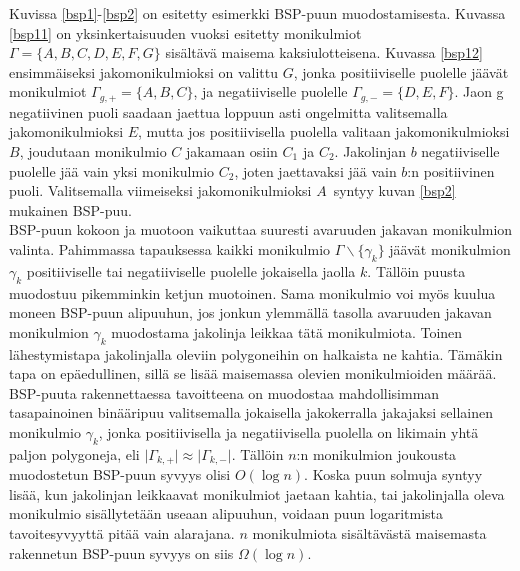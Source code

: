 \documentclass[a4paper, 12pt, titlepage]{article}
\newcommand{\abs}[1]{\vert #1 \vert} %
\begin{document}
Kuvissa \ref{bsp1}-\ref{bsp2} on esitetty esimerkki BSP-puun muodostamisesta. Kuvassa \ref{bsp11} on yksinkertaisuuden vuoksi esitetty monikulmiot $\Gamma=\{A,B,C,D,E,F,G\}$ sisältävä maisema kaksiulotteisena. Kuvassa \ref{bsp12} ensimmäiseksi jakomonikulmioksi on valittu $G$, jonka positiiviselle puolelle jäävät monikulmiot $\Gamma_{g,+} = \{A,B,C\}$, ja negatiiviselle puolelle $\Gamma_{g,-} = \{D,E,F\}$. Jaon g negatiivinen puoli saadaan jaettua loppuun asti ongelmitta valitsemalla jakomonikulmioksi $E$, mutta jos positiivisella puolella valitaan jakomonikulmioksi $B$, joudutaan monikulmio $C$ jakamaan osiin $C_1$ ja $C_2$. Jakolinjan $b$ negatiiviselle puolelle jää vain yksi monikulmio $C_2$, joten jaettavaksi jää vain $b$:n positiivinen puoli. Valitsemalla viimeiseksi jakomonikulmioksi $A$ syntyy kuvan \ref{bsp2} mukainen BSP-puu.\\

BSP-puun kokoon ja muotoon vaikuttaa suuresti avaruuden jakavan monikulmion valinta. Pahimmassa tapauksessa kaikki monikulmio $\Gamma\backslash\{\gamma_k\}$ jäävät monikulmion $\gamma_k$ positiiviselle tai negatiiviselle puolelle jokaisella jaolla $k$. Tällöin puusta muodostuu pikemminkin ketjun muotoinen. Sama monikulmio voi myös kuulua moneen BSP-puun alipuuhun, jos jonkun ylemmällä tasolla avaruuden jakavan monikulmion $\gamma_k$ muodostama jakolinja leikkaa tätä monikulmiota. \citep[.]{samet} Toinen lähestymistapa jakolinjalla oleviin polygoneihin on halkaista ne kahtia. Tämäkin tapa on epäedullinen, sillä se lisää maisemassa olevien monikulmioiden määrää. \citep[.]{ranta}\\ %

BSP-puuta rakennettaessa tavoitteena on muodostaa mahdollisimman tasapainoinen binääripuu valitsemalla jokaisella jakokerralla jakajaksi sellainen monikulmio $\gamma_k$, jonka positiivisella ja negatiivisella puolella on likimain yhtä paljon polygoneja, eli $\abs{\Gamma_{k,+}} \approx \abs{\Gamma_{k,-}}$. Tällöin  $n$:n monikulmion joukousta muodostetun BSP-puun syvyys olisi $O(\log n)$. Koska puun solmuja syntyy lisää, kun jakolinjan leikkaavat monikulmiot jaetaan kahtia, tai jakolinjalla oleva monikulmio sisällytetään useaan alipuuhun, voidaan puun logaritmista tavoitesyvyyttä pitää vain alarajana. \citep[.]{hughes} $n$ monikulmiota sisältävästä maisemasta rakennetun BSP-puun syvyys on siis $\Omega(\log n)$.\\
\end{document}
